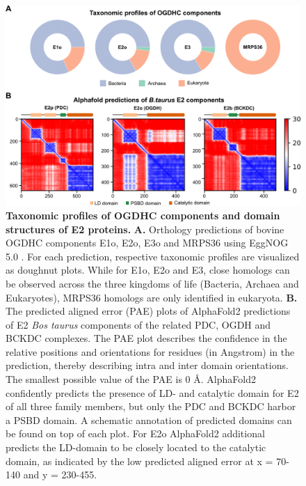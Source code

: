\begin{subappendices}
\begin{figure}[hbt!]
		\label{fig:ch5_app_fig1}
	\end{figure}
	\begin{figure}[hbt]
		\center
		\includegraphics[]{Chapter.5/Figures/SI_Figure2.png}
		\caption{\textbf{Taxonomic profiles of OGDHC components and domain structures of E2 proteins.} \textbf{A.} Orthology predictions of bovine OGDHC components E1o, E2o, E3o and MRPS36 using EggNOG 5.0 \cite{Huerta-Cepas_2019}. For each prediction, respective taxonomic profiles are visualized as doughnut plots. While for E1o, E2o and E3, close homologs can be observed across the three kingdoms of life (Bacteria, Archaea and Eukaryotes), MRPS36 homologs are only identified in eukaryota. \textbf{B.} The predicted aligned error (PAE) plots of AlphaFold2 predictions of E2 \emph{Bos taurus} components of the related PDC, OGDH and BCKDC complexes. The PAE plot describes the confidence in the relative positions and orientations for residues (in Angstrom) in the prediction, thereby describing intra and inter domain orientations. The smallest possible value of the PAE is 0 Å. AlphaFold2 confidently predicts the presence of LD- and catalytic domain for E2 of all three family members, but only the PDC and BCKDC harbor a PSBD domain. A schematic annotation of predicted domains can be found on top of each plot. For E2o AlphaFold2 additional predicts the LD-domain to be closely located to the catalytic domain, as indicated by the low predicted aligned error at x = 70-140 and y = 230-455.}
		\label{fig:ch5_app_fig2}
	\end{figure}
	\begin{figure}[hbt]
		\center

\end{figure}
\end{subappendices}
